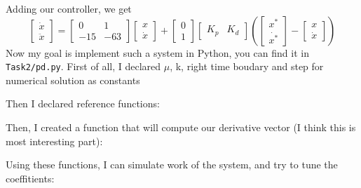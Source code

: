 \documentclass[a4paper,12pt]{article}
\begin{document}
        Adding our controller, we get 
        \begin{equation*}
            \begin{bmatrix}
                \dot{x}\\
                \ddot{x}
            \end{bmatrix}
            = 
            \begin{bmatrix}
                0 & 1 \\
                -15 & -63
            \end{bmatrix}
            \begin{bmatrix}
                x\\
                \dot{x}
            \end{bmatrix}
            +
            \begin{bmatrix}
                0 \\
                1
            \end{bmatrix}
            \begin{bmatrix}
                K_p & K_d
            \end{bmatrix}
            \left(
            \begin{bmatrix}
                x^*\\
                \dot{x^*}
            \end{bmatrix}
            -
            \begin{bmatrix}
                x\\
                \dot{x}
            \end{bmatrix}
            \right)
        \end{equation*}
        Now my goal is implement such a system in Python, you can find it in 
        \texttt{Task2/pd.py}. First of all, I declared $\mu$, k, right time 
        boudary and step for numerical solution as constants
        
        Then I declared reference functions:
        
        Then, I created a function that will compute our derivative vector (I think 
        this is most interesting part):
        
        Using these functions, I can simulate work of the system, and try to tune the 
        coeffitients:
        
\end{document}
